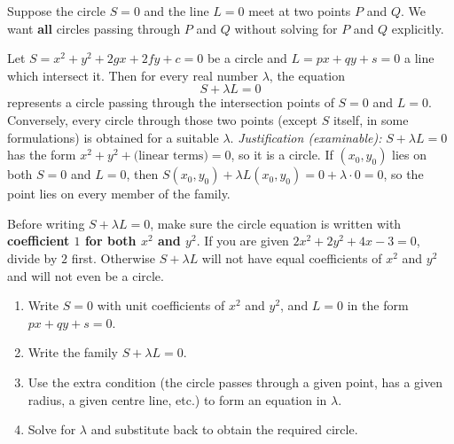 \documentclass[11pt]{article}
\begin{document}
Suppose the circle $S = 0$ and the line $L = 0$ meet at two points $P$ and $Q$. We want \textbf{all} circles passing through $P$ and $Q$ without solving for $P$ and $Q$ explicitly.

\begin{propriete}[The family $S + \lambda L = 0$]
Let $S = x^{2} + y^{2} + 2gx + 2fy + c = 0$ be a circle and $L = px + qy + s = 0$ a line which intersect it. Then for every real number $\lambda$, the equation
\[
S + \lambda L = 0
\]
represents a circle passing through the intersection points of $S = 0$ and $L = 0$. Conversely, every circle through those two points (except $S$ itself, in some formulations) is obtained for a suitable $\lambda$. \emph{Justification (examinable):} $S + \lambda L = 0$ has the form $x^{2} + y^{2} + \text{(linear terms)} = 0$, so it is a circle. If $(x_{0}, y_{0})$ lies on both $S = 0$ and $L = 0$, then $S(x_{0},y_{0}) + \lambda L(x_{0},y_{0}) = 0 + \lambda \cdot 0 = 0$, so the point lies on every member of the family.
\end{propriete}

\begin{attention}
Before writing $S + \lambda L = 0$, make sure the circle equation is written with \textbf{coefficient $1$ for both $x^{2}$ and $y^{2}$}. If you are given $2x^{2} + 2y^{2} + 4x - 3 = 0$, divide by $2$ first. Otherwise $S + \lambda L$ will not have equal coefficients of $x^{2}$ and $y^{2}$ and will not even be a circle.
\end{attention}

\begin{methode}[Using the family $S + \lambda L = 0$]
\begin{enumerate}
\item Write $S = 0$ with unit coefficients of $x^{2}$ and $y^{2}$, and $L = 0$ in the form $px + qy + s = 0$.
\item Write the family $S + \lambda L = 0$.
\item Use the extra condition (the circle passes through a given point, has a given radius, a given centre line, etc.) to form an equation in $\lambda$.
\item Solve for $\lambda$ and substitute back to obtain the required circle.
\end{enumerate}
\end{methode}
\end{document}
